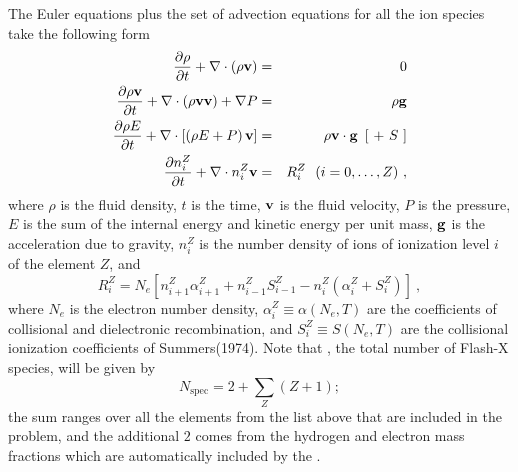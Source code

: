 The Euler equations plus the set of advection equations for all the
ion species take the following form
\begin{eqnarray}
\label{Eqn:ioeuler1}
{{\partial \rho} \over {\partial t}}
 + {\bf \nabla} \cdot \left ( \rho {\bf v} \right ) & = & 0\\
{\partial \rho {\bf v} \over \partial t} +
 {\bf \nabla}  \cdot \left ( \rho {\bf v} {\bf v} \right ) +
 {\bf \nabla}  P
 & = & \rho {\bf g}\\
\label{Eqn:ioeuler3}
{\partial \rho E \over \partial t} +
 {\bf \nabla} \cdot \left [ \left ( \rho E + P \right ) {\bf v}
 \right ] & = &
 \rho {\bf v} \cdot {\bf g} \ \left  [\ +\ S\ \right ] \\
\label{Eqn:ioeuler4}
 {\partial n_i^Z \over \partial t} + {\bf \nabla} \cdot n_i^Z {\bf v}
& = & R_i^Z \ \ (i=0,\ldots,Z) \ ,
\end{eqnarray}
where $\rho$ is the fluid density, $t$ is the time, ${\bf v}$ is the
fluid velocity, $P$ is the pressure, $E$ is the sum of the internal
energy and kinetic energy per unit mass, ${\bf g}$ is the
acceleration due to gravity, $n_i^Z$ is the number density of ions
of ionization level $i$ of the element $Z$, 
and
\begin{equation}
R_i^Z = N_e[n_{i+1}^Z \alpha_{i+1}^Z + n_{i-1}^Z S_{i-1}^Z -
n_{i}^Z(\alpha_{i}^Z + S_{i}^Z)]~,
\end{equation}
where $N_e$ is the electron number density, $\alpha_{i}^Z \equiv
\alpha(N_e, T)$ are the coefficients of collisional and dielectronic recombination, 
and $S_i^Z \equiv S(N_e, T)$ are the collisional
ionization coefficients of Summers(1974).
Note that , the total number of Flash-X species, will be given by
$$ N_{\mathrm{spec}} = 2 + \sum_Z (Z+1) ;$$
the sum ranges over all the elements from the list above that are included
in the problem, and the additional $2$ comes from the hydrogen and electron mass
fractions which are automatically included by the  \subunit.

